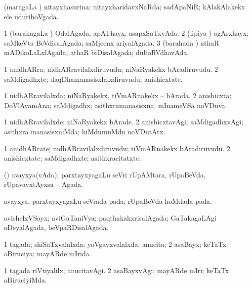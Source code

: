 \bentry
{}
\gl{\gu}
\bmng
(maragaLa \vi) nitayxhasurina; nitayxharidavxNaRda; sadApaNiR; kAlakAlakekx ele udurihoVgada. 
\emng
\eentry

\bentry
{}
\gl{\gu}
\bmng
\bnum
\num{1} (barahagaLa \vi) OdalAgada; apAThayx; asapxSaTxvAda. 
\num{2} (lipiya \vi) agArxhayx; saMkeVta BeVdisalAgada; saMjecnx ariyalAgada. 
\num{3} (barahada \vi) athaR mADikoLaLxlAgada; athaR biDisalAgada; duboRVdhavAda. 
\enum
\emng
\eentry

\bentry
{}
\gl{\nA}
\bmng
\bnum
\num{1} anidhARra; nidhARravilalxdiruvudu; niNaRyakekx bAradiruvudu. 
\num{2} saMdigadhxte; daqDhamanasisxlalxdiruvudu; anishicxtate. 
\enum
\emng
\eentry

\bentry
{}
\gl{\gu}
\bmng
\bnum
\num{1} nidhARravilalxda; niNaRyakekx, tiVmARnakekx -- bArada. 
\num{2} anishicxta; DoVlAyamAna; saMdigadhx; asithxramanasisxna; mInameVSa noVDuva. 
\enum
\emng
\eentry

\bentry
{}
\gl{\kirxvi}
\bmng
\bnum
\num{1} nidhARravilalxde; niNaRyakekx bArade. 
\num{2} anishicxtavAgi; saMdigadhxvAgi; asithxra manasisxniMda; hiMdumuMdu noVDutAtx. 
\enum
\emng
\eentry

\bentry
{}
\gl{\nA}
\bmng
\bnum
\num{1} anidhARrate; nidhARravilalxdiruvudu; tiVmARnakekx bAradiruvudu. 
\num{2} anishicxtate; saMdigadhxte; asithxracitatxte. 
\enum
\emng
\eentry

\bentry
{}
\gl{\gu}
\bmng
(\vAyx) avayxya(vAda); parxtayxyagaLu seVri rUpAMtara, rUpaBeVda, rUpavayxtAyxsa -- Agada. 
\emng
\eentry

\bentry
{}
\gl{\nA}
\bmng
avayxya; parxtayxyagaLu seVrada pada; rUpaBeVda hoMdada pada. 
\emng
\eentry

\bentry
{}
\gl{\gu}
\bmng
avishelxVSayx; aviGaTaniVya; paqthakakxrisalAgada; GaTakagaLAgi oDeyalAgada, beVpaRDisalAgada. 
\emng
\eentry

\bentry
{}
\gl{\gu}
\bmng
\bnum
\num{1} tagada; shiSaTxvalalxda; yoVgayxvalalxda; anucita; 
\num{2} asaBayx; keTaTx aBiruciya; mayARde mIrida. 
\enum
\emng
\eentry

\bentry
{}
\gl{\kirxvi}
\bmng
\bnum
\num{1} tagada riVtiyalilx; anucitavAgi. 
\num{2} asaBayxvAgi; mayARde mIri; keTaTx aBiruciyiMda. 
\enum
\emng
\eentry

